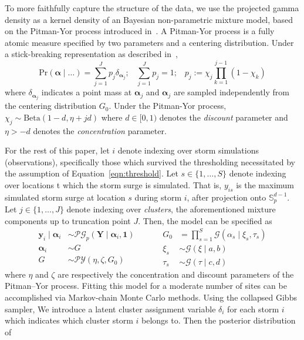 To more faithfully capture the structure of the data, we use the projected gamma density 
    as a kernel density of an Bayesian non-parametric mixture model, based on 
    the Pitman-Yor process introduced in~\cite{perman1992}.  A Pitman-Yor process
    is a fully atomic measure specified by two parameters and a centering
    distribution.  Under a stick-breaking representation as described 
    in~\cite{ishwaran2001}, 
    \[
        \text{Pr}(\bm{\alpha}\mid\ldots) 
            = \sum_{j = 1}^Jp_j\delta_{\bm{\alpha}_j};\;\;\;
            \sum_{j=1}^Jp_j = 1;\;\;\;
            p_j := \chi_j\prod_{k = 1}^{j-1}(1 - \chi_k)
    \]
    where $\delta_{\bm{\alpha}_j}$ indicates a point mass at $\bm{\alpha}_j$ and
    $\bm{\alpha}_j$ are sampled independently from the centering distribution $G_0$.
    Under the Pitman-Yor process, $\chi_j \sim \text{Beta}(1 - d, \eta + jd)$
    where $d \in [0, 1)$ denotes the \emph{discount} parameter and $\eta > -d$
    denotes the \emph{concentration} parameter.

For the rest of this paper, let $i$ denote indexing over storm simulations (observations), 
    specifically those which survived the thresholding necessitated by the assumption of 
    Equation~\eqref{eqn:threshold}.  Let $s \in \lbrace 1, \ldots, S\rbrace$ denote indexing 
    over locations t which the storm surge is simulated.  That is, $y_{is}$ is the maximum simulated
    storm surge at location $s$ during storm $i$, after projection onto $\mathbb{S}_p^{d-1}$.
    Let $j\in \lbrace 1,\ldots,J\rbrace$ denote indexing over \emph{clusters}, the aforementioned
    mixture components up to truncation point $J$.  Then, the model can be specified as
    \begin{equation}
        \begin{aligned}
            \bm{y}_i \mid \bm{\alpha}_i &\sim
                \mathcal{PG}_p\left(\bm{Y}\mid\bm{\alpha}_i,\bm{1}\right)\\
            \bm{\alpha}_i &\sim G\\
            G &\sim \mathcal{PY}\left(\eta, \zeta, G_0\right)        
        \end{aligned}
        ~\hspace{1cm}
        \begin{aligned}
            G_0 &= {\textstyle\prod}_{s = 1}^{S}\mathcal{G}(\alpha_{s}\mid \xi_{s},\tau_{s})\\
            \xi_{s} &\sim \mathcal{G}(\xi\mid a, b)\\
            \tau_{s} &\sim \mathcal{G}(\tau\mid c, d)
        \end{aligned} 
    \end{equation}
    where $\eta$ and $\zeta$ are respectively the concentration and discount parameters
    of the Pitman--Yor process.  Fitting this model for a moderate number of sites can be 
    accomplished via Markov-chain Monte Carlo methods.  Using the collapsed Gibbs sampler,
    We introduce a latent cluster assignment variable $\delta_i$ for each storm $i$ which 
    indicates which cluster storm $i$ belongs to.  Then the posterior distribution of

